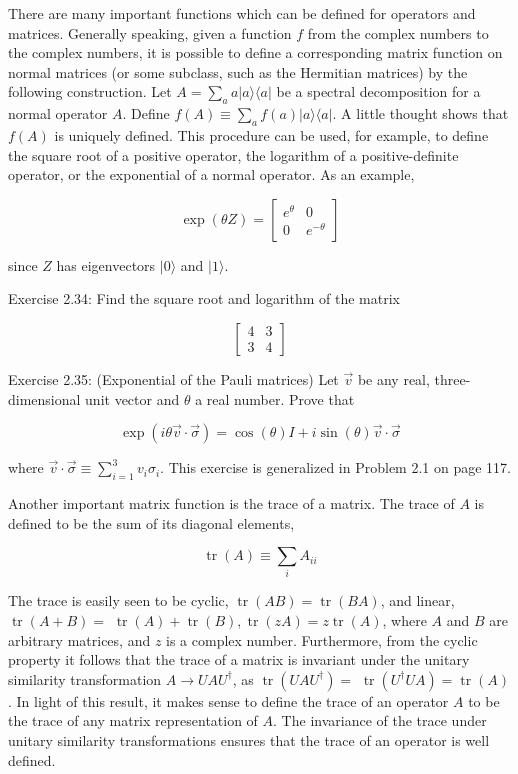 There are many important functions which can be defined for operators and matrices. Generally speaking, given a function $f$ from the complex numbers to the complex numbers, it is possible to define a corresponding matrix function on normal matrices (or some subclass, such as the Hermitian matrices) by the following construction. Let $A=\sum_{a} a|a\rangle\langle a|$ be a spectral decomposition for a normal operator $A$. Define $f(A) \equiv \sum_{a} f(a)|a\rangle\langle a|$. A little thought shows that $f(A)$ is uniquely defined. This procedure can be used, for example, to define the square root of a positive operator, the logarithm of a positive-definite operator, or the exponential of a normal operator. As an example,

$$
\exp (\theta Z)=\left[\begin{array}{cc}
e^{\theta} & 0 \\
0 & e^{-\theta}
\end{array}\right]
$$

since $Z$ has eigenvectors $|0\rangle$ and $|1\rangle$.

Exercise 2.34: Find the square root and logarithm of the matrix

$$
\left[\begin{array}{ll}
4 & 3 \\
3 & 4
\end{array}\right]
$$

Exercise 2.35: (Exponential of the Pauli matrices) Let $\vec{v}$ be any real, three-dimensional unit vector and $\theta$ a real number. Prove that

$$
\exp (i \theta \vec{v} \cdot \vec{\sigma})=\cos (\theta) I+i \sin (\theta) \vec{v} \cdot \vec{\sigma}
$$

where $\vec{v} \cdot \vec{\sigma} \equiv \sum_{i=1}^{3} v_{i} \sigma_{i}$. This exercise is generalized in Problem 2.1 on page 117.

Another important matrix function is the trace of a matrix. The trace of $A$ is defined to be the sum of its diagonal elements,

$$
\operatorname{tr}(A) \equiv \sum_{i} A_{i i}
$$

The trace is easily seen to be cyclic, $\operatorname{tr}(A B)=\operatorname{tr}(B A)$, and linear, $\operatorname{tr}(A+B)=$ $\operatorname{tr}(A)+\operatorname{tr}(B), \operatorname{tr}(z A)=z \operatorname{tr}(A)$, where $A$ and $B$ are arbitrary matrices, and $z$ is a complex number. Furthermore, from the cyclic property it follows that the trace of a matrix is invariant under the unitary similarity transformation $A \rightarrow U A U^{\dagger}$, as $\operatorname{tr}\left(U A U^{\dagger}\right)=$ $\operatorname{tr}\left(U^{\dagger} U A\right)=\operatorname{tr}(A)$. In light of this result, it makes sense to define the trace of an operator $A$ to be the trace of any matrix representation of $A$. The invariance of the trace under unitary similarity transformations ensures that the trace of an operator is well defined.


